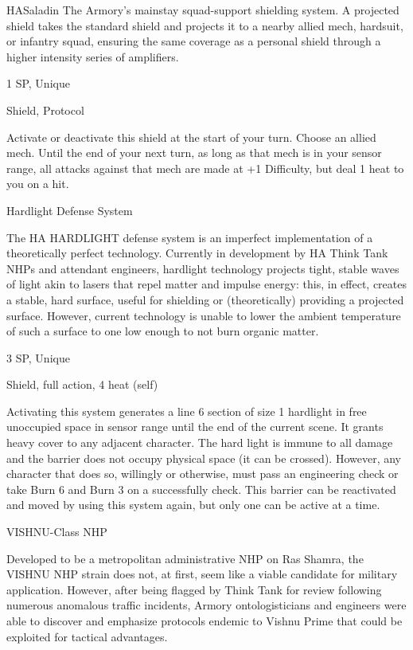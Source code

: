 \begin{mech}{HA}{Saladin}
The Armory’s mainstay squad-support shielding system. A projected shield takes the standard shield and projects it to a nearby allied mech, hardsuit, or infantry squad, ensuring the same coverage as a personal shield through a higher intensity series of amplifiers.

1 SP, Unique

Shield, Protocol

Activate or deactivate this shield at the start of your turn. Choose an allied mech. Until the end of your next turn, as long as that mech is in your sensor range, all attacks against that mech are made at +1 Difficulty, but deal 1 heat to you on a hit.


Hardlight Defense System

The HA HARDLIGHT defense system is an imperfect implementation of a theoretically perfect technology. Currently in development by HA Think Tank NHPs and attendant engineers, hardlight technology projects tight, stable waves of light akin to lasers that repel matter and impulse energy: this, in effect, creates a stable, hard surface, useful for shielding or (theoretically) providing a projected surface. However, current technology is unable to lower the ambient temperature of such a surface to one low enough to not burn organic matter.

3 SP, Unique

Shield, full action, 4 heat (self)

Activating this system generates a line 6 section of size 1 hardlight in free unoccupied space in sensor range until the end of the current scene. It grants heavy cover to any adjacent character. The hard light is immune to all damage and the barrier does not occupy physical space (it can be crossed). However, any character that does so, willingly or otherwise, must pass an engineering check or take Burn 6 and Burn 3 on a successfully check. This barrier can be reactivated and moved by using this system again, but only one can be active at a time.


VISHNU-Class NHP

Developed to be a metropolitan administrative NHP on Ras Shamra, the VISHNU NHP strain does not, at first, seem like a viable candidate for military application. However, after being flagged by Think Tank for review following numerous anomalous traffic incidents, Armory ontologisticians and engineers were able to discover and emphasize protocols endemic to Vishnu Prime that could be exploited for tactical advantages.


\end{mech}
